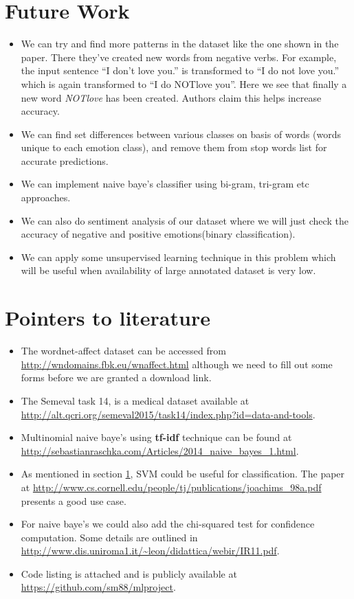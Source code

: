 \newpage
\section{Future Work}
\label{sec-plan-for-sem}
\begin{itemize}
 \item We can try and find more patterns in the dataset like the one shown in the paper. There they've created new words from negative verbs. For example, the input sentence ``I don't love you.'' is transformed to ``I do not love you.'' which is again transformed to ``I do NOTlove you''. Here we see that finally a new word \emph{NOTlove} has been created. Authors claim this helps increase accuracy.
 \item We can find set differences between various classes on basis of words (words unique to each emotion class), and remove them from stop words list for accurate predictions.
 \item We can implement naive baye's classifier using bi-gram, tri-gram etc approaches.
 \item We can also do sentiment analysis of our dataset where we will just check the accuracy of negative and positive emotions(binary classification).
 \item We can apply some unsupervised learning technique in this problem which will be useful when availability of large annotated dataset is very low.
\end{itemize}
\section{Pointers to literature}
\begin{itemize}
 \item The wordnet-affect dataset can be accessed from \url{http://wndomains.fbk.eu/wnaffect.html} although we need to fill out some forms before we are granted a download link.
 \item The Semeval task 14, is a medical dataset available at \url{http://alt.qcri.org/semeval2015/task14/index.php?id=data-and-tools}.
 \item Multinomial naive baye's using \textbf{tf-idf} technique can be found at \url{http://sebastianraschka.com/Articles/2014_naive_bayes_1.html}.
 \item As mentioned in section \ref{sec-plan-for-sem}, SVM could be useful for classification. The paper at \url{http://www.cs.cornell.edu/people/tj/publications/joachims_98a.pdf} presents a good use case.
 \item For naive baye's we could also add the chi-squared test for confidence computation. Some details are outlined in \url{http://www.dis.uniroma1.it/~leon/didattica/webir/IR11.pdf}.
 \item Code listing is attached and is publicly available at \url{https://github.com/sm88/mlproject}.
\end{itemize}

